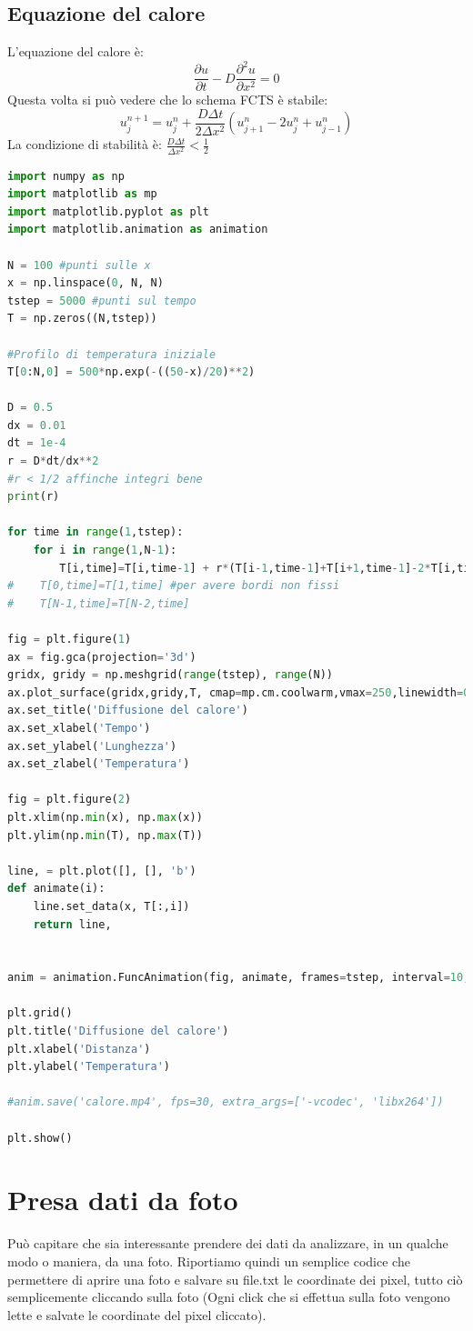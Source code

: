 \documentclass[10pt,a4paper]{article}
\begin{document}
\subsection{Equazione del calore}
L'equazione del calore è:
\[
\frac{\partial u}{\partial t} - D\frac{\partial^2 u}{\partial x^2}=0
\]
Questa volta si può vedere che lo schema FCTS è stabile:
\[
u^{n+1}_j = u^{n}_j + \frac{D \Delta t}{2 \Delta x^2} (u^n_{j+1} - 2u^n_j + u^n_{j-1})
\]
La condizione di stabilità è: $\frac{D \Delta t}{\Delta x^2} < \frac{1}{2}$

\begin{lstlisting}[language=Python]
import numpy as np
import matplotlib as mp
import matplotlib.pyplot as plt
import matplotlib.animation as animation

N = 100 #punti sulle x
x = np.linspace(0, N, N)
tstep = 5000 #punti sul tempo
T = np.zeros((N,tstep))

#Profilo di temperatura iniziale
T[0:N,0] = 500*np.exp(-((50-x)/20)**2)

D = 0.5
dx = 0.01
dt = 1e-4
r = D*dt/dx**2
#r < 1/2 affinche integri bene
print(r)

for time in range(1,tstep):
    for i in range(1,N-1):
        T[i,time]=T[i,time-1] + r*(T[i-1,time-1]+T[i+1,time-1]-2*T[i,time-1])
#    T[0,time]=T[1,time] #per avere bordi non fissi
#    T[N-1,time]=T[N-2,time]

fig = plt.figure(1)
ax = fig.gca(projection='3d')
gridx, gridy = np.meshgrid(range(tstep), range(N))
ax.plot_surface(gridx,gridy,T, cmap=mp.cm.coolwarm,vmax=250,linewidth=0,rstride=2, cstride=100)
ax.set_title('Diffusione del calore')
ax.set_xlabel('Tempo')
ax.set_ylabel('Lunghezza')
ax.set_zlabel('Temperatura')

fig = plt.figure(2)
plt.xlim(np.min(x), np.max(x))
plt.ylim(np.min(T), np.max(T))

line, = plt.plot([], [], 'b')
def animate(i):
    line.set_data(x, T[:,i])
    return line,


anim = animation.FuncAnimation(fig, animate, frames=tstep, interval=10, blit=True, repeat=True)

plt.grid()
plt.title('Diffusione del calore')
plt.xlabel('Distanza')
plt.ylabel('Temperatura')

#anim.save('calore.mp4', fps=30, extra_args=['-vcodec', 'libx264'])

plt.show()
\end{lstlisting}

\newpage

\section{Presa dati da foto}
Può capitare che sia interessante prendere dei dati da analizzare, in un qualche modo o maniera, da una foto. Riportiamo quindi un semplice codice che permettere di aprire una foto e salvare su file.txt le coordinate dei pixel, tutto ciò semplicemente cliccando sulla foto (Ogni click che si effettua sulla foto vengono lette e salvate le coordinate del pixel cliccato).
\end{document}
